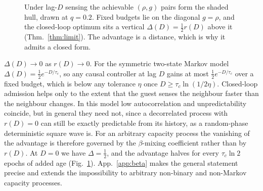 \begin{figure}[t]
\centering
{}
\caption{Under lag-$D$ sensing the achievable $(\rho,g)$ pairs form the shaded
hull, drawn at $q=0.2$. Fixed budgets lie on the diagonal $g=\rho$, and the
closed-loop optimum sits a vertical $\Delta(D)=\tfrac12 r(D)$ above it
(Thm.~\ref{thm:limit}). The advantage is a distance, which is why it admits a
closed form.}
\label{fig:theory}
\end{figure}

\begin{corollary}\label{cor:imp}
$\Delta(D)\!\to\!0$ as $r(D)\!\to\!0$. For the symmetric two-state Markov model
$\Delta(D)=\tfrac12 e^{-D/\tau_c}$, so any causal controller at lag $D$ gains at
most $\tfrac12 e^{-D/\tau_c}$ over a fixed budget, which is below any tolerance
$\eta$ once $D\ge\tau_c\ln(1/2\eta)$. Closed-loop admission helps only to
the extent that the guest senses the neighbour faster than the neighbour changes.
In this model low autocorrelation and unpredictability coincide, but in general
they need not, since a decorrelated process with $r(D){=}0$ can still be exactly
predictable from its history, as a random-phase deterministic square wave is. For
an arbitrary capacity process the vanishing of the advantage is therefore governed
by the $\beta$-mixing coefficient rather than by $r(D)$. At $D=0$ we have
$\Delta=\tfrac12$, and the advantage halves for every $\tau_c\ln 2$ epochs of
added age (Fig.~\ref{fig:theory}). App.~\ref{app:beta} makes the general
statement precise and extends the impossibility to arbitrary non-binary and
non-Markov capacity processes.
\end{corollary}

